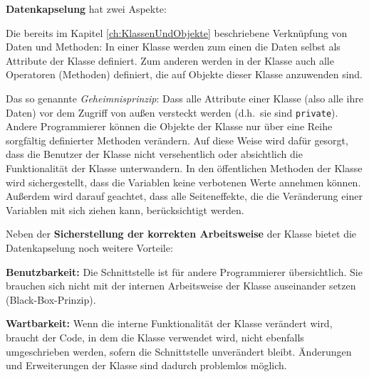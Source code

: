 \textbf{Datenkapselung} hat zwei Aspekte:

\begin{compactenum}
\item Die bereits im Kapitel \ref{ch:KlassenUndObjekte} beschriebene
Verknüpfung von Daten und Methoden: In einer Klasse werden zum einen die Daten
selbst als Attribute der Klasse definiert. Zum anderen werden in der Klasse auch
alle Operatoren (Methoden) definiert, die auf Objekte dieser Klasse anzuwenden
sind.
\item Das so genannte \emph{Geheimnisprinzip}: Dass alle Attribute einer Klasse
(also alle ihre Daten) vor dem Zugriff von außen versteckt werden (d.h.\ sie
sind \lstinline|private|). Andere Programmierer können die Objekte der Klasse
nur über eine Reihe sorgfältig definierter Methoden verändern. Auf diese Weise
wird dafür gesorgt, dass die Benutzer der Klasse nicht versehentlich oder
absichtlich die Funktionalität der Klasse unterwandern. In den öffentlichen
Methoden der Klasse wird sichergestellt, dass die Variablen keine verbotenen
Werte annehmen können. Außerdem wird darauf geachtet, dass alle Seiteneffekte,
die die Veränderung einer Variablen mit sich ziehen kann, berücksichtigt werden.
\end{compactenum}

Neben der \textbf{Sicherstellung der korrekten Arbeitsweise} der Klasse bietet
die Datenkapselung noch weitere Vorteile:

\begin{compactitem}
\item[\textbf{Benutzbarkeit:}] Die Schnittstelle ist für andere Programmierer
übersichtlich. Sie brauchen sich nicht mit der internen Arbeitsweise der Klasse
auseinander setzen (Black-Box-Prinzip).
\item[\textbf{Wartbarkeit:}] Wenn die interne Funktionalität der Klasse
verändert wird, braucht der Code, in dem die Klasse verwendet wird, nicht
ebenfalls umgeschrieben werden, sofern die Schnittstelle unverändert bleibt.
Änderungen und Erweiterungen der Klasse sind dadurch problemlos möglich.
\end{compactitem}
